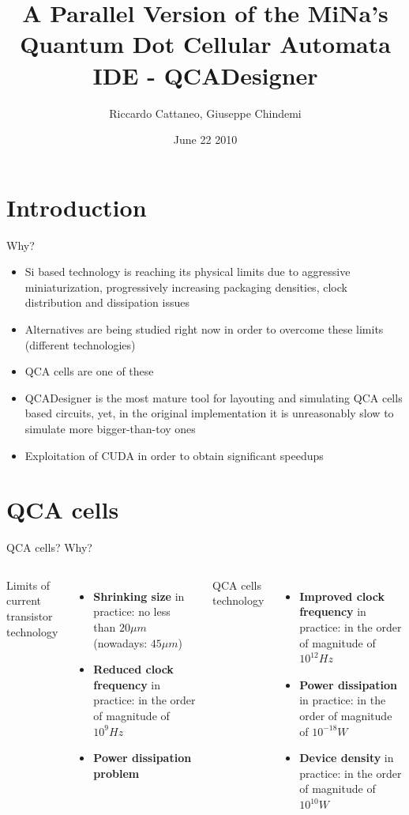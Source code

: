 \documentclass[10pt, red]{beamer}
\title[CUDAQCADesigner]{A Parallel Version of the MiNa's Quantum Dot Cellular Automata IDE - QCADesigner}
\author{Riccardo Cattaneo, Giuseppe Chindemi}
\institute{
  Politecnico di Milano\\
  HPPS
}
\date{June 22 2010}
\begin{document}
\begin{frame}
  \titlepage
\end{frame}

\section{Introduction}
	\begin{frame}{Why?}
		\begin{itemize} 
			\item Si based technology is reaching its physical limits due to aggressive miniaturization, progressively increasing packaging densities, clock distribution and dissipation issues
			\item Alternatives are being studied right now in order to overcome these limits (different technologies)
			\item QCA cells are one of these
			\item QCADesigner is the most mature tool for layouting and simulating QCA cells based circuits, yet, in the original implementation it is unreasonably slow to simulate more bigger-than-toy ones
			\item Exploitation of CUDA in order to obtain significant speedups
		\end{itemize}
	\end{frame}

\section{QCA cells}
	\begin{frame}{QCA cells? Why?}
		\begin{columns}
		\centering
	
			Limits of current transistor technology 
		 	\begin{itemize}
			 	\item	\textbf{Shrinking size} in practice: no less than $  20 \mu m $ (nowadays: $45\mu m$)
			 	\item \textbf{Reduced clock frequency} in practice: in the order of magnitude of $10^9 Hz$
			 	\item \textbf{Power dissipation problem}
		 	\end{itemize}
			 	
			QCA cells technology
		 	\begin{itemize}
			 	\item \textbf{Improved clock frequency} in practice: in the order of magnitude of $10^{12} Hz$
			 	\item \textbf{Power dissipation} in practice: in the order of magnitude of $10^{-18} W$
			 	\item \textbf{Device density} in practice: in the order of magnitude of $10^{10} W$
		 	\end{itemize}
		\end{columns}
	\end{frame}
\end{document}
